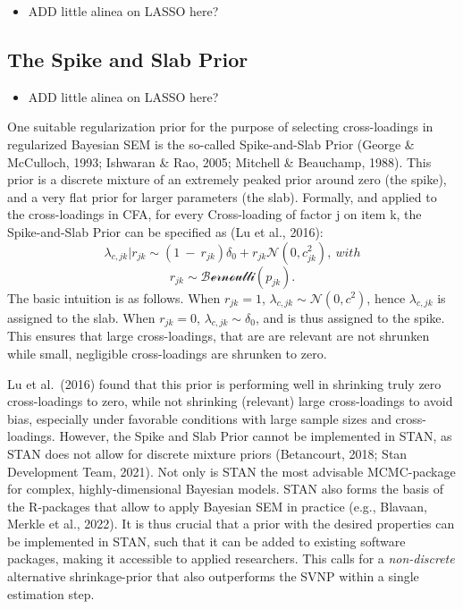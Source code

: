 \documentclass[
  man, donotrepeattitle,floatsintext]{apa6}
\providecommand{\tightlist}{%
  \setlength{\itemsep}{0pt}\setlength{\parskip}{0pt}}
\begin{document}
\begin{itemize}
\tightlist
\item
  ADD little alinea on LASSO here?
\end{itemize}

\hypertarget{the-spike-and-slab-prior}{%
\subsection{The Spike and Slab Prior}\label{the-spike-and-slab-prior}}

\begin{itemize}
\tightlist
\item
  ADD little alinea on LASSO here?
\end{itemize}

One suitable regularization prior for the purpose of selecting cross-loadings in
regularized Bayesian SEM is the so-called Spike-and-Slab Prior (George \& McCulloch, 1993; Ishwaran \& Rao, 2005; Mitchell \& Beauchamp, 1988). This prior is a discrete mixture of an extremely peaked prior around zero (the spike), and a very flat prior for larger parameters (the slab). Formally, and applied to the cross-loadings in CFA, for every Cross-loading of factor j
on item k, the Spike-and-Slab Prior can be specified as (Lu et al., 2016):
\[\lambda_{c,jk} |r_{jk} \sim (1 \ - \ r_{jk})\delta_0 + r_{jk} \mathcal{N}(0, c^2_{jk}) , \ with\]
\[r_{jk} \sim \mathcal{Bernoulli}(p_{jk}).\]
The basic intuition is as follows. When \(r_{jk} = 1\), \(\lambda_{c,jk} \sim \mathcal{N}(0, c^2)\), hence \(\lambda_{c,jk}\) is assigned to the slab. When \(r_{jk} = 0\), \(\lambda_{c,jk} \sim \delta_0\), and is thus assigned to the spike. This ensures that large cross-loadings, that are are relevant are not shrunken while small, negligible cross-loadings are shrunken to zero.

Lu et al.~(2016) found that this prior is performing well in shrinking truly zero cross-loadings to zero, while not shrinking (relevant) large cross-loadings to avoid bias, especially under favorable conditions with large sample sizes and cross-loadings. However, the Spike and Slab Prior cannot be implemented in STAN, as STAN does not allow for discrete mixture priors (Betancourt, 2018; Stan Development Team, 2021). Not only is STAN the most advisable MCMC-package for complex, highly-dimensional Bayesian models. STAN also forms the basis of the R-packages that allow to apply Bayesian SEM in practice (e.g., Blavaan, Merkle et al., 2022). It is thus crucial that a prior with the desired properties can be implemented in STAN, such that it can be added to existing software packages, making it accessible to applied researchers. This calls for a \emph{non-discrete} alternative shrinkage-prior that also outperforms the SVNP within a single estimation step.
\end{document}
